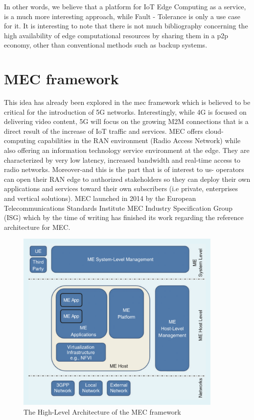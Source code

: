In other words, we believe that a platform for IoT Edge Computing as a service, is a much more interesting approach, while Fault - Tolerance is only a use case for it. It is interesting to note that there is not much bibliography concerning the high availability of edge computational resources by sharing them in a p2p economy, other than conventional methods such as backup systems. 

\section{MEC framework}

This idea has already been explored in the \acrfull{mec} framework\cite{7574435} which is believed to be critical for the introduction of 5G networks. Interestingly, while 4G is focused on delivering video content, 5G will focus on the growing M2M connections that is a direct result of the increase of IoT traffic and services\cite{cisco-visualise}. MEC offers cloud-computing capabilities in the RAN environment (Radio Access Network) while also offering an information technology service environment at the edge. They are characterized by very low latency, increased bandwidth and real-time access to radio networks. Moreover-and this is the part that is of interest to us- operators can open their RAN edge to authorized stakeholders so they can deploy their own applications and services toward their own subscribers (i.e private, enterprises and vertical solutions). MEC launched in 2014 by the European Telecommunications Standards Institute MEC Industry Specification Group (ISG) which by the time of writing has finished its work regarding the reference architecture for MEC.

\begin{figure}[ht]
    \centering
    \includegraphics[width=0.9\textwidth]{images/mecarch.png}
    \caption{The High-Level Architecture of the MEC framework\cite{7574435}}
    \label{fig:mec}
\end{figure}


